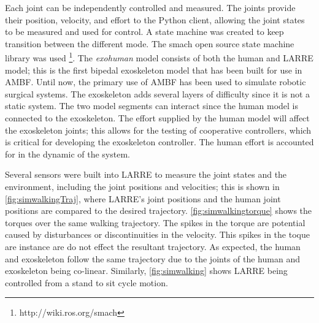  
 Each joint can be independently controlled and measured. The joints provide their position, velocity, and effort to the Python client, allowing the joint states to be measured and used for control. A state machine was created to keep transition between the different mode. The smach open source state machine library was used \footnote{http://wiki.ros.org/smach}. The \textit{exohuman} model consists of both the human and LARRE model; this is the first bipedal exoskeleton model that has been built for use in AMBF. Until now, the primary use of AMBF has been used to simulate robotic surgical systems. The exoskeleton adds several layers of difficulty since it is not a static system. The two model segments can interact since the human model is connected to the exoskeleton. The effort supplied by the human model will affect the exoskeleton joints; this allows for the testing of cooperative controllers, which is critical for developing the exoskeleton controller. The human effort is accounted for in the dynamic of the system.  
 
 
 Several sensors were built into LARRE to measure the joint states and the environment, including the joint positions and velocities; this is shown in \autoref{fig:simwalkingTraj}, where LARRE's joint positions and the human joint positions are compared to the desired trajectory.  \autoref{fig:simwalkingtorque} shows the torques over the same walking trajectory. The spikes in the torque are potential caused by disturbances or discontinuities in the velocity. This spikes in the toque are instance are do not effect the resultant trajectory. As expected, the human and exoskeleton follow the same trajectory due to the joints of the human and exoskeleton being co-linear. Similarly, \autoref{fig:simwalking} shows LARRE being controlled from a stand to sit cycle motion.
 
